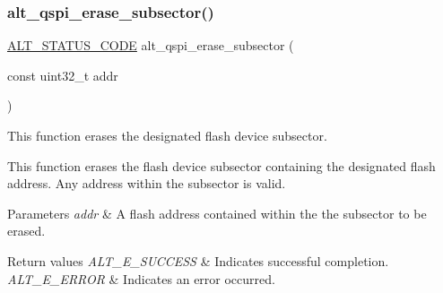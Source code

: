 \subsubsection{\texorpdfstring{alt\_qspi\_erase\_subsector()}{alt\_qspi\_erase\_subsector()}}
{\footnotesize\ttfamily \mbox{\hyperlink{hwlib_8h_abdb0d369f069723ca55d6c94bcaaaa12}{A\+L\+T\+\_\+\+S\+T\+A\+T\+U\+S\+\_\+\+C\+O\+DE}} alt\+\_\+qspi\+\_\+erase\+\_\+subsector (\begin{DoxyParamCaption}\item[{const uint32\+\_\+t}]{addr }\end{DoxyParamCaption})}

This function erases the designated flash device subsector.

This function erases the flash device subsector containing the designated flash address. Any address within the subsector is valid.


\begin{DoxyParams}{Parameters}
{\em addr} & A flash address contained within the the subsector to be erased.\\
\hline
\end{DoxyParams}

\begin{DoxyRetVals}{Return values}
{\em A\+L\+T\+\_\+\+E\+\_\+\+S\+U\+C\+C\+E\+SS} & Indicates successful completion. \\
\hline
{\em A\+L\+T\+\_\+\+E\+\_\+\+E\+R\+R\+OR} & Indicates an error occurred. \\
\hline
\end{DoxyRetVals}
